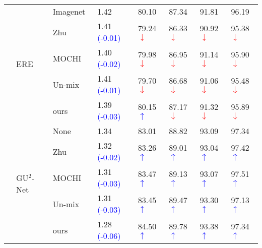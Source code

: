 \documentclass[10pt,twocolumn,letterpaper]{article}
\begin{document}
\begin{table*}[t]
\begin{threeparttable}
\begin{tabular}{l|l|l|lllll}
\cline{2-8}
 & \multirow{5}{*}{ERE~\cite{McCouat_2022_CVPR}} & Imagenet~\cite{DBLP:conf/cvpr/DengDSLL009} & 1.42 & 80.10 & 87.34 & 91.81 & 96.19 \\
 & & Zhu~\cite{zhu2021improving} & 1.41 \textcolor{blue}{(-0.01)} & 79.24\textcolor{red}{$\downarrow$} & 86.33\textcolor{red}{$\downarrow$} & 90.92\textcolor{red}{$\downarrow$} & 95.38\textcolor{red}{$\downarrow$} \\
 & & MOCHI~\cite{kalantidis2020hard} & 1.40 \textcolor{blue}{(-0.02)} & 79.98\textcolor{red}{$\downarrow$} & 86.95\textcolor{red}{$\downarrow$} & 91.14\textcolor{red}{$\downarrow$} & 95.90\textcolor{red}{$\downarrow$}\\
 & & Un-mix~\cite{shen2022mix}  & 1.41 \textcolor{blue}{(-0.01)} & 79.70\textcolor{red}{$\downarrow$} & 86.68\textcolor{red}{$\downarrow$} & 91.06\textcolor{red}{$\downarrow$} & 95.48\textcolor{red}{$\downarrow$} \\
 & & ours  & 1.39 \textcolor{blue}{(-0.03)} & 80.15\textcolor{blue}{$\uparrow$} & 87.17\textcolor{red}{$\downarrow$} & 91.32\textcolor{red}{$\downarrow$} & 95.89\textcolor{red}{$\downarrow$}\\
\cline{2-8}
 & \multirow{5}{*}{GU$^2$-Net~\cite{zhu2021you}} & None & 1.34 & 83.01 & 88.82 & 93.09 & 97.34\\
 & & Zhu~\cite{zhu2021improving} & 1.32 \textcolor{blue}{(-0.02)} & 83.26\textcolor{blue}{$\uparrow$} & 89.01\textcolor{blue}{$\uparrow$} & 93.04\textcolor{blue}{$\uparrow$} & 97.42\textcolor{blue}{$\uparrow$}\\
 & & MOCHI~\cite{kalantidis2020hard} & 1.31 \textcolor{blue}{(-0.03)} & 83.47\textcolor{blue}{$\uparrow$} & 89.13\textcolor{blue}{$\uparrow$} & 93.07\textcolor{blue}{$\uparrow$} & 97.51\textcolor{blue}{$\uparrow$}\\
 & & Un-mix~\cite{shen2022mix}  & 1.31 \textcolor{blue}{(-0.03)} & 83.45\textcolor{blue}{$\uparrow$} & 89.47\textcolor{blue}{$\uparrow$} & 93.30\textcolor{blue}{$\uparrow$} & 97.13\textcolor{blue}{$\uparrow$}\\
 & & ours  & 1.28 \textcolor{blue}{(-0.06)} & 84.50\textcolor{blue}{$\uparrow$} & 89.78\textcolor{blue}{$\uparrow$} & 93.38\textcolor{blue}{$\uparrow$} & 97.34\textcolor{blue}{$\uparrow$} \\
\cline{1-8}


\end{tabular}
\end{threeparttable}
\end{table*}
\end{document}
